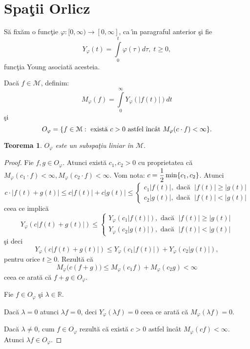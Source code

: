 \documentclass[ a4paper, 12pt]{report}
\newtheorem{theorem}{\bf Teorema}[section]
\theoremstyle{definition}
\theoremstyle{remark}
\numberwithin{equation}{section}
\begin{document}
\newpage


\section{Spa\c tii Orlicz}

S\u a fix\u am o func\c tie $\varphi : [0,\infty) \rightarrow [0,\infty]$, ca \^\i n paragraful anterior \c si fie
$$Y_\varphi (t)=\int\limits_{0}^{t} \varphi (\tau) d\tau, \; t \geq 0,$$ func\c tia Young asociat\u a acesteia.

Dac\u a $f \in \mathcal{M}$, definim:
$$M_\varphi (f) = \int\limits_{0}^{\infty} Y_\varphi (\lvert f(t) \rvert)dt$$ \c si
$$O_\varphi = \{f \in \mathcal{M} : \hbox{ exist\u a } c>0 \hbox{ astfel \^\i nc\^ at } M_\varphi (c \cdot f) < \infty\}.$$

\begin{theorem}
$O_\varphi$ este un subspa\c tiu liniar \^in $\mathcal{M}.$
\end{theorem}

\begin{proof}
Fie $f,g \in O_\varphi$. Atunci exist\u a $ c_1,c_2>0$ cu proprietatea c\u a $M_\varphi(c_1 \cdot f)<\infty, M_\varphi(c_2 \cdot f)<\infty.$
Vom nota: $c = \displaystyle\frac{1}{2}\min\{c_1,c_2\}$. Atunci
$$c \cdot \lvert f(t)+g(t) \rvert \leq c\lvert f(t)\rvert + c\lvert g(t) \rvert\leq \begin{cases}
c_1 \lvert f(t) \rvert, \text{ dac\u a } \;\lvert f(t) \rvert \geq \lvert g(t) \rvert \\
c_2 \lvert g(t) \rvert, \text{ dac\u a } \;\lvert f(t) \rvert<\lvert g(t) \rvert
\end{cases}$$
ceea ce implic\u a
$$Y_\varphi (c\lvert f(t)+g(t) \rvert) \leq \begin{cases}
Y_\varphi (c_1 \lvert f(t) \rvert), \text{ dac\u a } \; \lvert f(t)\rvert \geq \lvert g(t) \rvert\\
Y_\varphi (c_2 \lvert g(t) \rvert), \text{ dac\u a } \; \lvert f(t)\rvert < \lvert g(t) \rvert
\end{cases}$$
\c si deci
$$Y_\varphi (c \lvert f(t)+g(t) \rvert)\leq Y_\varphi(c_1 \lvert f(t)\rvert)+ Y_\varphi(c_2 \lvert g(t)\rvert),$$ pentru orice $t \geq 0$. Rezult\u a c\u a
 $$ M_\varphi \Big(c (f+g)\Big) \leq M_\varphi(c_1 f) + M_\varphi(c_2 g) < \infty$$ ceea ce arat\u a c\u a $f+g \in O_\varphi$.

Fie $f \in O_\varphi$ \c si $\lambda \in \mathbb{R}$.

Dac\u a $\lambda = 0$ atunci $\lambda f = 0$, deci $Y_\varphi(\lambda f) = 0$ ceea ce arat\u a c\u a $M_\varphi (\lambda f) = 0.$

Dac\u a $\lambda \neq 0$, cum $f \in O_\varphi$ rezult\u a c\u a exist\u a $c >0 $ astfel \^inc\^at $M_\varphi (cf)< \infty$. Atunci $\lambda f \in O_\varphi$.
\end{proof}
\end{document}
